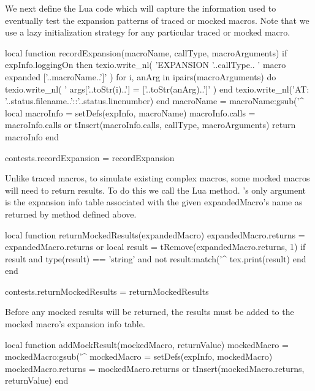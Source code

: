 \def\stopLoggingExpansions{%
  \directlua{thirddata.contests.setExpansionLogging(false)}
}

\def\logMessage#1{%
  \writestatus{contests}{#1}#1\\
}
\stopMkIVCode

We next define the Lua code which will capture the information used to 
eventually test the expansion patterns of traced or mocked macros. Note 
that we use a lazy initialization strategy for any particular traced or 
mocked macro. 

\startLuaCode
local function recordExpansion(macroName,
                               callType,
                               macroArguments)
  if expInfo.loggingOn then
    texio.write_nl(
      'EXPANSION '..callType..
      ' macro expanded ['..macroName..']'
    )
    for i, anArg in ipairs(macroArguments) do
      texio.write_nl(
        '  args['..toStr(i)..'] = ['..toStr(anArg)..']'
      )
    end
    texio.write_nl('AT: '..status.filename..'::'..status.linenumber)
  end
  macroName = macroName:gsub('^%
  local macroInfo    = setDefs(expInfo, macroName)
  macroInfo.calls    = macroInfo.calls or { }
  tInsert(macroInfo.calls, { callType, macroArguments})
  return macroInfo
end

contests.recordExpansion = recordExpansion
\stopLuaCode

Unlike traced macros, to simulate existing complex macros, some mocked 
macros will need to return  results. To do this we call the 
 Lua method. 's only 
argument is the expansion info table associated with the given 
expandedMacro's name as returned by  method defined 
above. 

\startLuaCode
local function returnMockedResults(expandedMacro)
  expandedMacro.returns = expandedMacro.returns or { }
  local result = tRemove(expandedMacro.returns, 1)
  if result and 
     type(result) == 'string' and
     not result:match('^%
    tex.print(result)
  end
end

contests.returnMockedResults = returnMockedResults
\stopLuaCode

Before any mocked results will be returned, the  results 
must be added to the mocked macro's expansion info table. 

\startLuaCode
local function addMockResult(mockedMacro, returnValue)
  mockedMacro = mockedMacro:gsub('^%
  mockedMacro          = setDefs(expInfo, mockedMacro)
  mockedMacro.returns  = mockedMacro.returns or { }
  tInsert(mockedMacro.returns, returnValue)
end

